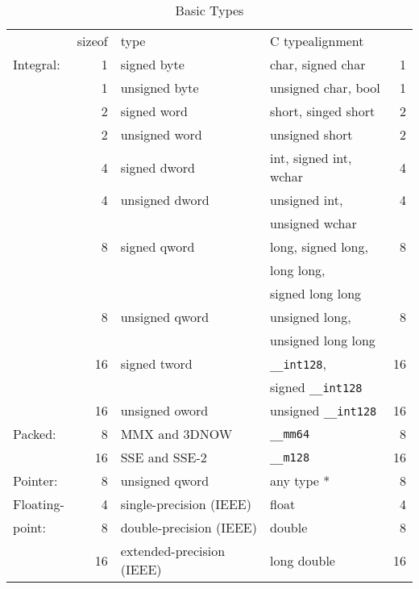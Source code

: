 \begin{table}
\caption{Basic Types}\label{tab-basic-types}
\begin{tabular}{lrllr}
\hline\noalign{\smallskip}
&sizeof & type			&\multicolumn{2}{l}{C type\hfill alignment} \\
\noalign{\smallskip}\hline\noalign{\smallskip}
Integral:
&1	& signed byte		&        char, signed char		& 1 \\
&1	& unsigned byte		&        unsigned char, bool		& 1 \\
&2	& signed word		&        short, singed short		& 2 \\
&2	& unsigned word		&        unsigned short			& 2 \\
&4	& signed dword		&        int, signed int, wchar		& 4 \\
&4	& unsigned dword	&        unsigned int,	& 4 \\
&       &                       &        unsigned wchar & \\
&8	& signed qword		&        long, signed long, 	& 8 \\
&        &                       &       long long, 		&  \\
&        &                       &       signed long long		&  \\
&8	& unsigned qword	&                unsigned long,		&	8 \\
&        &                       &          unsigned long long		& \\
&16	& signed tword		&        \verb|__int128|, & 16 \\
&	& 		        &        signed \verb|__int128|	&  \\
&16	& unsigned oword	&                unsigned \verb|__int128|	&	16 \\
\hline
Packed:
&8	& MMX and 3DNOW		&	\verb|__mm64|				& 8 \\
&16	& SSE and SSE-2		&	\verb|__m128|				& 16 \\
\hline
Pointer:
&8	& unsigned qword	&		any type *		& 8 \\
\hline
Floating-
&4	& single-precision (IEEE) &	float				& 4 \\
point:&8	& double-precision (IEEE) &	double				& 8 \\
&16	& extended-precision (IEEE) & 	long double			& 16 \\
\hline
\end{tabular}
\end{table}

